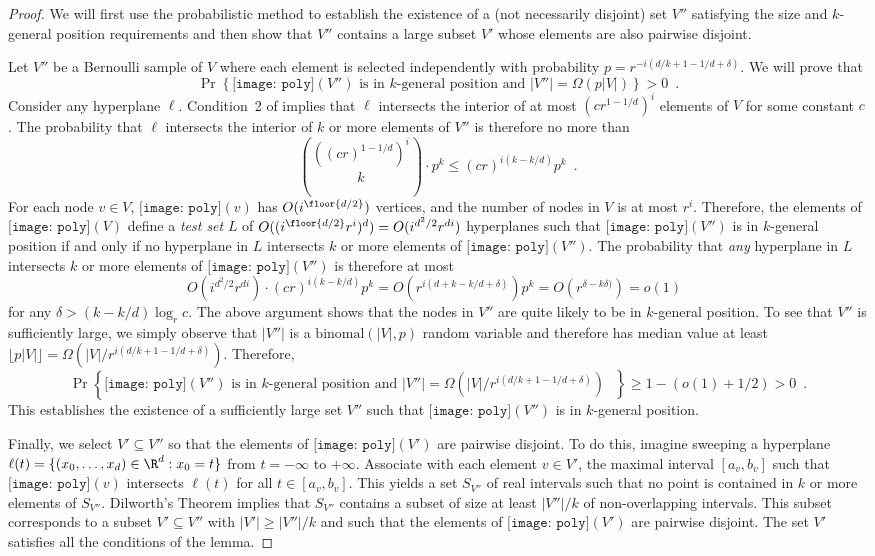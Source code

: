 \documentclass{patmorin}
\newcommand{\poly}{\texttt{[image: poly]}}
\begin{document}
\begin{proof}
  We will first use the probabilistic method \cite{as08} to establish
  the existence of a (not necessarily disjoint) set $V''$ satisfying the
  size and $k$-general position requirements and then show that $V''$
  contains a large subset $V'$ whose elements are also pairwise disjoint.

  Let $V''$ be a Bernoulli sample of $V$ where each element is selected
  independently with probability $p=r^{-i(d/k+1-1/d+\delta)}$. We
  will prove that
  \[
     \Pr\left\{
        \mbox{$\poly(V'')$ is in $k$-general position 
          and $|V''| = \Omega(p|V|)$}
      \right\} > 0 \enspace .
  \]
  Consider any hyperplane $\ell$. Condition~2 of
   implies that $\ell$ intersects the
  interior of at most $(cr^{1-1/d})^{i}$ elements of $V$ for some
  constant $c$.  The probability that $\ell$ intersects the interior of
  $k$ or more elements of $V''$ is therefore no more than
  \[
    \binom{((cr)^{1-1/d})^{i}}{k}\cdot p^k
    \le (cr)^{i(k-k/d)}p^k  \enspace .
  \]
  For each node $v\in V$, $\poly(v)$ has $O(i^{\floor{d/2}})$
  vertices, and the number of nodes in $V$ is at most $r^{i}$.
  Therefore, the elements of $\poly(V)$ define a \emph{test set} $L$ of
  $O((i^{\floor{d/2}}r^i)^d)=O(i^{d^2/2}r^{di})$ hyperplanes such that
  $\poly(V'')$ is in $k$-general position if and only if no hyperplane in
  $L$ intersects $k$ or more elements of $\poly(V'')$. The probability
  that \emph{any} hyperplane in $L$ intersects $k$ or more elements of
  $\poly(V'')$ is therefore at most
  \[
    O(i^{d^2/2}r^{di})\cdot (cr)^{i(k-k/d)}p^k
     = O(r^{i(d+k-k/d+\delta)})p^k 
     = O(r^{\delta-k\delta)})
     = o(1) \enspace 
  \]
  for any $\delta > (k-k/d)\log_r c$.
  The above argument shows that the nodes in
  $V''$ are quite likely to be in $k$-general position. To see that
  $V''$ is sufficiently large, we simply observe that $|V''|$ is a
  $\mathrm{binomal}(|V|,p)$ random variable and therefore has median
  value at least $\lfloor{p|V|}\rfloor = \Omega(|V|/r^{i(d/k+1-1/d+\delta)})$.
  Therefore,
  \[
     \Pr\left\{
        \mbox{$\poly(V'')$ is in $k$-general position 
          and $|V''| = \Omega(|V|/r^{i(d/k+1-1/d+\delta)})$ }
      \right\} \ge 1- (o(1) + 1/2) > 0 \enspace .
  \]
  This establishes the existence of a sufficiently large set $V''$
  such that $\poly(V'')$ is in $k$-general position.

  Finally, we select $V'\subseteq V''$ so that the elements of
  $\poly(V')$ are pairwise disjoint.  To do this, imagine
  sweeping a hyperplane $\ell(t)=\{(x_0,\ldots,x_d)\in\R^d:x_0=t\}$ from
  $t=-\infty$ to $+\infty$.  Associate with each element $v\in V'$, the
  maximal interval $[a_v,b_v]$ such that $\poly(v)$ intersects $\ell(t)$
  for all $t\in[a_v,b_v]$. This yields a set $S_{V''}$ of real intervals
  such that no point is contained in $k$ or more elements of $S_{V''}$.
  Dilworth's Theorem \cite{d50} implies that $S_{V''}$ contains a subset
  of size at least $|V''|/k$ of non-overlapping intervals. This subset
  corresponds to a subset $V'\subseteq V''$ with $|V'|\ge |V''|/k$
  and such that the elements of $\poly(V')$ are pairwise
  disjoint. The set $V'$ satisfies all the conditions of the lemma.
\end{proof}
\end{document}
